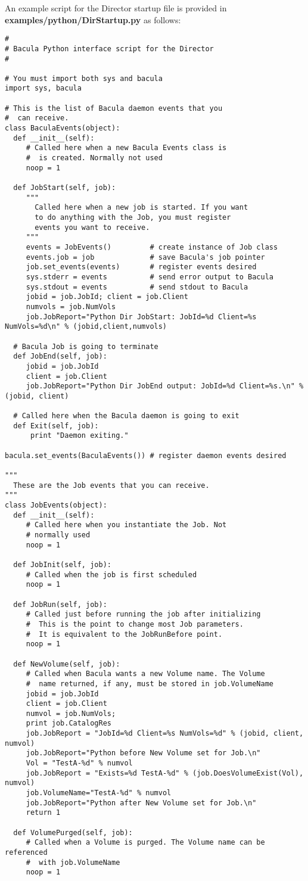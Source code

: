 An example script for the Director startup file is provided in
{\bf examples/python/DirStartup.py} as follows:

\footnotesize
\begin{verbatim}
#
# Bacula Python interface script for the Director
#

# You must import both sys and bacula
import sys, bacula

# This is the list of Bacula daemon events that you
#  can receive.
class BaculaEvents(object):
  def __init__(self):
     # Called here when a new Bacula Events class is
     #  is created. Normally not used 
     noop = 1

  def JobStart(self, job):
     """
       Called here when a new job is started. If you want
       to do anything with the Job, you must register
       events you want to receive.
     """
     events = JobEvents()         # create instance of Job class
     events.job = job             # save Bacula's job pointer
     job.set_events(events)       # register events desired
     sys.stderr = events          # send error output to Bacula
     sys.stdout = events          # send stdout to Bacula
     jobid = job.JobId; client = job.Client
     numvols = job.NumVols 
     job.JobReport="Python Dir JobStart: JobId=%d Client=%s NumVols=%d\n" % (jobid,client,numvols) 

  # Bacula Job is going to terminate
  def JobEnd(self, job):    
     jobid = job.JobId
     client = job.Client 
     job.JobReport="Python Dir JobEnd output: JobId=%d Client=%s.\n" % (jobid, client) 

  # Called here when the Bacula daemon is going to exit
  def Exit(self, job):
      print "Daemon exiting."
     
bacula.set_events(BaculaEvents()) # register daemon events desired

"""
  These are the Job events that you can receive.
"""
class JobEvents(object):
  def __init__(self):
     # Called here when you instantiate the Job. Not
     # normally used
     noop = 1
     
  def JobInit(self, job):
     # Called when the job is first scheduled
     noop = 1
     
  def JobRun(self, job):
     # Called just before running the job after initializing
     #  This is the point to change most Job parameters.
     #  It is equivalent to the JobRunBefore point.
     noop = 1

  def NewVolume(self, job):
     # Called when Bacula wants a new Volume name. The Volume
     #  name returned, if any, must be stored in job.VolumeName
     jobid = job.JobId
     client = job.Client
     numvol = job.NumVols;
     print job.CatalogRes
     job.JobReport = "JobId=%d Client=%s NumVols=%d" % (jobid, client, numvol)
     job.JobReport="Python before New Volume set for Job.\n"
     Vol = "TestA-%d" % numvol
     job.JobReport = "Exists=%d TestA-%d" % (job.DoesVolumeExist(Vol), numvol)
     job.VolumeName="TestA-%d" % numvol
     job.JobReport="Python after New Volume set for Job.\n"
     return 1

  def VolumePurged(self, job):
     # Called when a Volume is purged. The Volume name can be referenced
     #  with job.VolumeName
     noop = 1



\end{verbatim}
\normalsize
